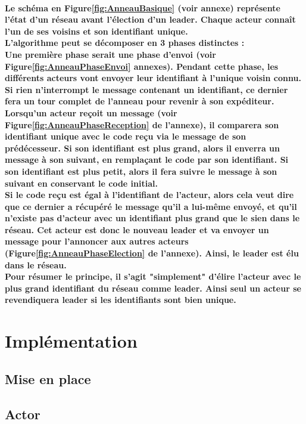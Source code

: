 \documentclass[12pt]{article}
\begin{document}
\paragraph{Le schéma en Figure\ref{fig:AnneauBasique} (voir annexe) représente l'état d'un réseau avant l'élection d'un leader. Chaque acteur connaît l'un de ses voisins et son identifiant unique.
\\
L'algorithme peut se décomposer en 3 phases distinctes :\\
Une première phase serait une phase d'envoi (voir Figure\ref{fig:AnneauPhaseEnvoi} annexes). Pendant cette phase, les différents acteurs vont envoyer leur identifiant à l'unique voisin connu. Si rien n'interrompt le message contenant un identifiant, ce dernier fera un tour complet de l'anneau pour revenir à son expéditeur.
\\
Lorsqu'un acteur reçoit un message (voir Figure\ref{fig:AnneauPhaseReception} de l'annexe), il comparera son identifiant unique avec le code reçu via le message de son prédécesseur. Si son identifiant est plus grand, alors il enverra un message à son suivant, en remplaçant le code par son identifiant. Si son identifiant est plus petit, alors il fera suivre le message à son suivant en conservant le code initial.
\\
Si le code reçu est égal à l'identifiant de l'acteur, alors cela veut dire que ce dernier a récupéré le message qu'il a lui-même envoyé, et qu'il n'existe pas d'acteur avec un identifiant plus grand que le sien dans le réseau. Cet acteur est donc le nouveau leader et va envoyer un message pour l'annoncer aux autres acteurs (Figure\ref{fig:AnneauPhaseElection} de l'annexe). Ainsi, le leader est élu dans le réseau.
\\
Pour résumer le principe, il s'agit "simplement" d'élire l'acteur avec le plus grand identifiant du réseau comme leader. Ainsi seul un acteur se revendiquera leader si les identifiants sont bien unique.}
\section{Implémentation}
\subsection{Mise en place}

\subsection{Actor}
\end{document}
